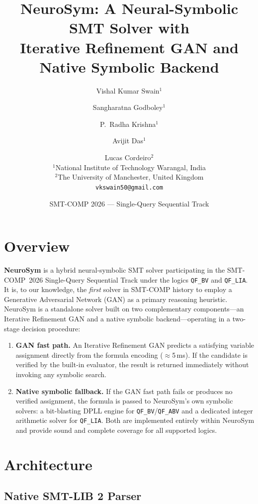 \documentclass[10pt,a4paper]{article}
\title{\textbf{NeuroSym}: A Neural-Symbolic SMT Solver with\\
       Iterative Refinement GAN and Native Symbolic Backend}
\author{
  Vishal Kumar Swain$^{1}$ \and
  Sangharatna Godboley$^{1}$ \and
  P.\ Radha Krishna$^{1}$ \and
  Avijit Das$^{1}$ \and
  Lucas Cordeiro$^{2}$\\[4pt]
  \small $^{1}$National Institute of Technology Warangal, India\\
  \small $^{2}$The University of Manchester, United Kingdom\\[2pt]
  \small \texttt{vkswain50@gmail.com}
}
\date{SMT-COMP 2026 — Single-Query Sequential Track}
\begin{document}
\maketitle

\section{Overview}

\textbf{NeuroSym} is a hybrid neural-symbolic SMT solver participating in the
SMT-COMP~2026 Single-Query Sequential Track under the logics \texttt{QF\_BV}
and \texttt{QF\_LIA}.  It is, to our knowledge, the \emph{first} solver in
SMT-COMP history to employ a Generative Adversarial Network (GAN) as a
primary reasoning heuristic.  NeuroSym is a standalone solver built on two
complementary components---an Iterative Refinement GAN and a native symbolic
backend---operating in a two-stage decision procedure:

\begin{enumerate}
  \item \textbf{GAN fast path.}  An Iterative Refinement GAN predicts a
        satisfying variable assignment directly from the formula encoding
        ($\approx$5\,ms).  If the candidate is verified by the built-in
        evaluator, the result is returned immediately without invoking any
        symbolic search.
  \item \textbf{Native symbolic fallback.}  If the GAN fast path fails or
        produces no verified assignment, the formula is passed to NeuroSym's
        own symbolic solvers: a bit-blasting DPLL engine for
        \texttt{QF\_BV}/\texttt{QF\_ABV} and a dedicated integer arithmetic
        solver for \texttt{QF\_LIA}.  Both are implemented entirely within
        NeuroSym and provide sound and complete coverage for all supported
        logics.
\end{enumerate}

\section{Architecture}

\subsection{Native SMT-LIB 2 Parser}
\end{document}
